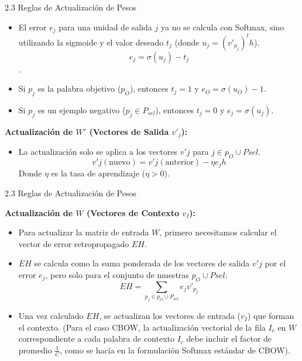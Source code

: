 \documentclass{beamer}
\begin{document}
\begin{frame}{2.3  Reglas de Actualización de Pesos}
	\begin{itemize}
		\item El error $e_j$ para una unidad de salida $j$ ya no se calcula con Softmax, sino utilizando la sigmoide y el valor deseado $t_j$ (donde $u_j = (v'_{p_j})^t h$). $$ e_j = \sigma(u_j) - t_j $$.
		\item Si $p_j$ es la palabra objetivo ($p_O$), entonces $t_j = 1$ y $e_O = \sigma(u_O) - 1$.
		\item Si $p_j$ es un ejemplo negativo ($p_j \in P_{sel}$), entonces $t_j = 0$ y $e_j = \sigma(u_j)$.
	\end{itemize}
	
	\textbf{Actualización de $W'$ (Vectores de Salida $v'_j$):}\\
	\begin{itemize}
		\item La actualización solo se aplica a los vectores $v'j$ para $j \in {p_O} \cup P{sel}$. $$ v'{j}(\text{nuevo}) = v'{j}(\text{anterior}) - \eta e_j h $$ Donde $\eta$ es la tasa de aprendizaje ($\eta > 0$).	
	\end{itemize}


\end{frame}	
	

	
	
	
\begin{frame}{2.3  Reglas de Actualización de Pesos}
	
	\textbf{Actualización de $W$ (Vectores de Contexto $v_I$):}\\
	\begin{itemize}
		\item Para actualizar la matriz de entrada $W$, primero necesitamos calcular el vector de error retropropagado $EH$.
		\item $EH$ se calcula como la suma ponderada de los vectores de salida $v'j$ por el error $e_j$, pero solo para el conjunto de muestras ${p_O} \cup P{sel}$: $$ EH = \sum_{p_j \in {p_O} \cup P_{sel}} e_j v'_{p_j} $$
		\item Una vez calculado $EH$, se actualizan los vectores de entrada ($v_I$) que forman el contexto. (Para el caso CBOW, la actualización vectorial de la fila $I_c$ en $W$ correspondiente a cada palabra de contexto $I_c$ debe incluir el factor de promedio $\frac{1}{C}$, como se hacía en la formulación Softmax estándar de CBOW).	
	\end{itemize}
	
	
\end{frame}	
\end{document}
